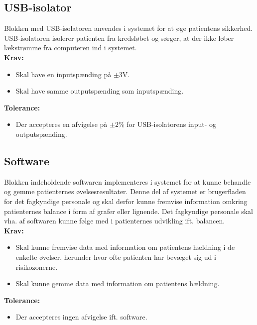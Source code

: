 \subsection{USB-isolator}\label{kravspecifikationer_USB}
Blokken med USB-isolatoren anvendes i systemet for at øge patientens sikkerhed. USB-isolatoren isolerer patienten fra kredsløbet og sørger, at der ikke løber lækstrømme fra computeren ind i systemet.\\
\textbf{Krav:}
\begin{itemize}
	\item Skal have en inputspænding på $\pm3$V.
	\item Skal have samme outputspænding som inputspænding. 
\end{itemize}
\textbf{Tolerance:}
\begin{itemize}
	\item Der accepteres en afvigelse på $\pm2\%$ for USB-isolatorens input- og outputspænding. 
\end{itemize}
\subsection{Software}\label{subsec:software}
Blokken indeholdende softwaren implementeres i systemet for at kunne behandle og gemme patienternes øvelsesresultater. Denne del af systemet er brugerfladen for det fagkyndige personale og skal derfor kunne fremvise information omkring patienternes balance i form af grafer eller lignende. Det fagkyndige personale skal vha. af softwaren kunne følge med i patienternes udvikling ift. balancen. \\
\textbf{Krav:}
\begin{itemize}
	\item Skal kunne fremvise data med information om patientens hældning i de enkelte øvelser, herunder hvor ofte patienten har bevæget sig ud i risikozonerne. 
	\item Skal kunne gemme data med information om patientens hældning.
\end{itemize}
\textbf{Tolerance:}
\begin{itemize}
	\item Der accepteres ingen afvigelse ift. software. 
\end{itemize}
